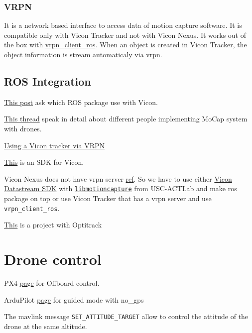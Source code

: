             \subsubsection{VRPN}
                It is a network based interface to access data of motion capture software. It is compatible only with Vicon Tracker and not with Vicon Nexus. It works out of the box with \href{https://wiki.ros.org/vrpn_client_ros}{vrpn\_client\_ros}. When an object is created in Vicon Tracker, the object information is stream automaticaly via vrpn.
                
        \subsection{ROS Integration}
            \href{https://answers.ros.org/question/329849/which-ros-package-use-with-vicon/}{This post} ask which ROS package use with Vicon.
            
            \href{https://discuss.ardupilot.org/t/position-hold-with-vision-position-estimate-and-att-pos-mocap-for-indoor-localization/29626/5}{This thread} speak in detail about different people implementing MoCap system with drones.
            
            \href{https://support.middlevr.com/hc/en-us/articles/203900225-Using-a-Vicon-tracker-via-VRPN}{Using a Vicon tracker via VRPN}
            
            \href{https://www.vicon.com/downloads/utilities-and-sdk/datastream-sdk}{This} is an SDK for Vicon.
            
            Vicon Nexus does not have vrpn server \href{https://forum.worldviz.com/printthread.php?s=aff0c689c7c7ff36a324fa2335838db4&t=4273}{ref}. So we have to use either \href{https://www.vicon.com/downloads/utilities-and-sdk/datastream-sdk}{Vicon Datastream SDK} with \href{https://github.com/USC-ACTLab/libmotioncapture}{\texttt{libmotioncapture}} from USC-ACTLab and make ros package on top or use Vicon Tracker that has a vrpn server and use \texttt{vrpn\_client\_ros}.
        
            \href{http://ardupilot.org/copter/docs/common-optitrack.html#common-optitrack}{This} is a project with Optitrack
    
    \section{Drone control}
        PX4 \href{https://discuss.ardupilot.org/t/offboard-control/37869}{page} for Offboard control.
        
        ArduPilot \href{http://ardupilot.org/copter/docs/ac2_guidedmode.html#guided-nogps}{page} for guided mode with no\_gps
        
        The mavlink message \texttt{SET\_ATTITUDE\_TARGET} allow to control the attitude of the drone at the same altitude.